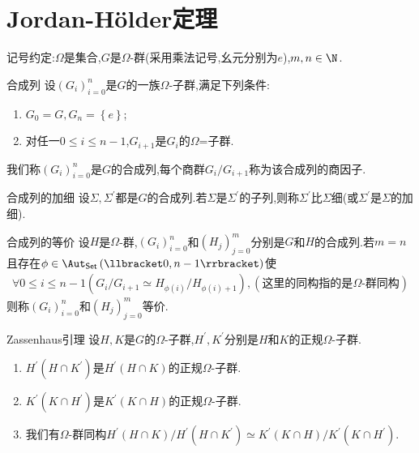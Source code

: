 \section{Jordan-H\"older定理}

记号约定:$\Omega$是集合,$G$是$\Omega$-群(采用乘法记号,幺元分别为$e$),$m,n\in\N$.

\begin{definition}{合成列}{}
	设$\left(G_{i}\right)_{i=0}^{n}$是$G$的一族$\Omega$-子群,满足下列条件:
	\begin{enumerate}
		\item $G_{0}=G,G_{n}=\left\{e\right\}$;
		\item 对任一$0\leq i\leq n-1$,$G_{i+1}$是$G_{i}$的$\Omega$=子群.
	\end{enumerate}
	我们称$\left(G_{i}\right)_{i=0}^{n}$是$G$的合成列,每个商群$G_{i}/G_{i+1}$称为该合成列的商因子.
\end{definition}

\begin{definition}{合成列的加细}{}
	设$\Sigma,\Sigma^{\prime}$都是$G$的合成列.若$\Sigma$是$\Sigma^{\prime}$的子列,则称$\Sigma^{\prime}$比$\Sigma$细(或$\Sigma^{\prime}$是$\Sigma$的加细).
\end{definition}

\begin{definition}{合成列的等价}{}
	设$H$是$\Omega$-群,$\left(G_{i}\right)_{i=0}^{n}$和$\left(H_{j}\right)_{j=0}^{m}$分别是$G$和$H$的合成列.若$m=n$且存在$\phi\in\Aut_{\mathsf{Set}}\left(\llbracket 0,n-1\rrbracket\right)$使
	\begin{align*}
		\forall 0\leq i\leq n-1\left(G_{i}/G_{i+1}\simeq H_{\phi\left(i\right)}/H_{\phi\left(i\right)+1}\right),(\text{这里的同构指的是}\Omega\text{-群同构})
	\end{align*}
	则称$\left(G_{i}\right)_{i=0}^{n}$和$\left(H_{j}\right)_{j=0}^{m}$等价.
\end{definition}

\begin{lemma}{Zassenhaus引理}{}
	设$H,K$是$G$的$\Omega$-子群,$H^{\prime},K^{\prime}$分别是$H$和$K$的正规$\Omega$-子群.
	\begin{enumerate}
		\item $H^{\prime}\left(H\cap K^{\prime}\right)$是$H^{\prime}\left(H\cap K\right)$的正规$\Omega$-子群.
		\item $K^{\prime}\left(K\cap H^{\prime}\right)$是$K^{\prime}\left(K\cap H\right)$的正规$\Omega$-子群.
		\item 我们有$\Omega$-群同构$H^{\prime}\left(H\cap K\right)/H^{\prime}\left(H\cap K^{\prime}\right)\simeq K^{\prime}\left(K\cap H\right)/K^{\prime}\left(K\cap H^{\prime}\right)$.
	\end{enumerate}
\end{lemma}

